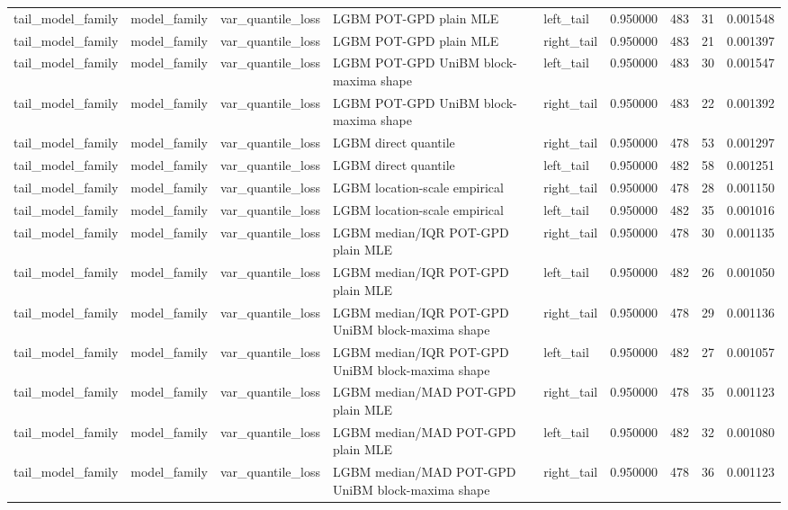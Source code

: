 \begin{tabular}{lllllrrrr}
tail\_model\_family & model\_family & var\_quantile\_loss & LGBM POT-GPD plain MLE & left\_tail & 0.950000 & 483 & 31 & 0.001548 \\
tail\_model\_family & model\_family & var\_quantile\_loss & LGBM POT-GPD plain MLE & right\_tail & 0.950000 & 483 & 21 & 0.001397 \\
tail\_model\_family & model\_family & var\_quantile\_loss & LGBM POT-GPD UniBM block-maxima shape & left\_tail & 0.950000 & 483 & 30 & 0.001547 \\
tail\_model\_family & model\_family & var\_quantile\_loss & LGBM POT-GPD UniBM block-maxima shape & right\_tail & 0.950000 & 483 & 22 & 0.001392 \\
tail\_model\_family & model\_family & var\_quantile\_loss & LGBM direct quantile & right\_tail & 0.950000 & 478 & 53 & 0.001297 \\
tail\_model\_family & model\_family & var\_quantile\_loss & LGBM direct quantile & left\_tail & 0.950000 & 482 & 58 & 0.001251 \\
tail\_model\_family & model\_family & var\_quantile\_loss & LGBM location-scale empirical & right\_tail & 0.950000 & 478 & 28 & 0.001150 \\
tail\_model\_family & model\_family & var\_quantile\_loss & LGBM location-scale empirical & left\_tail & 0.950000 & 482 & 35 & 0.001016 \\
tail\_model\_family & model\_family & var\_quantile\_loss & LGBM median/IQR POT-GPD plain MLE & right\_tail & 0.950000 & 478 & 30 & 0.001135 \\
tail\_model\_family & model\_family & var\_quantile\_loss & LGBM median/IQR POT-GPD plain MLE & left\_tail & 0.950000 & 482 & 26 & 0.001050 \\
tail\_model\_family & model\_family & var\_quantile\_loss & LGBM median/IQR POT-GPD UniBM block-maxima shape & right\_tail & 0.950000 & 478 & 29 & 0.001136 \\
tail\_model\_family & model\_family & var\_quantile\_loss & LGBM median/IQR POT-GPD UniBM block-maxima shape & left\_tail & 0.950000 & 482 & 27 & 0.001057 \\
tail\_model\_family & model\_family & var\_quantile\_loss & LGBM median/MAD POT-GPD plain MLE & right\_tail & 0.950000 & 478 & 35 & 0.001123 \\
tail\_model\_family & model\_family & var\_quantile\_loss & LGBM median/MAD POT-GPD plain MLE & left\_tail & 0.950000 & 482 & 32 & 0.001080 \\
tail\_model\_family & model\_family & var\_quantile\_loss & LGBM median/MAD POT-GPD UniBM block-maxima shape & right\_tail & 0.950000 & 478 & 36 & 0.001123 \\

\end{tabular}
